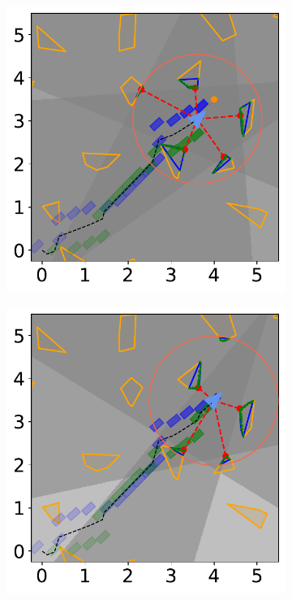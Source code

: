 \begin{figure}[H]
    \begin{subfigure}{0.30\textwidth}
        \centering
        \includegraphics[width=\textwidth]{figures/Simulations/sim2unkenv/frame_8.pdf}
    \end{subfigure}%
    \hspace{1em}
    \begin{subfigure}{0.30\textwidth}
        \centering
        \includegraphics[width=\textwidth]{figures/Simulations/sim2unkenv/frame_9.pdf}

\end{subfigure}
\end{figure}
